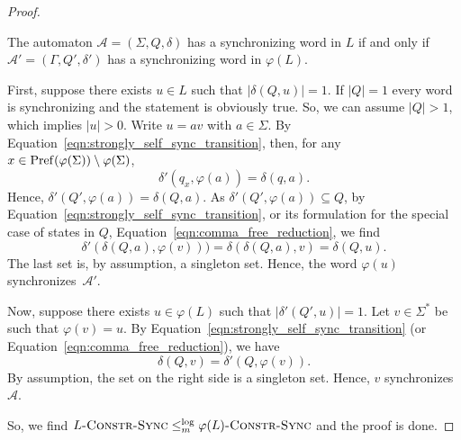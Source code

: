 \begin{proof}
  \begin{myclaiminproof}
   The automaton $\mathcal A = (\Sigma, Q, \delta)$
   has a synchronizing word in $L$
   if and only if $\mathcal A' = (\Gamma, Q', \delta')$
   has a synchronizing word in $\varphi(L)$.
  \end{myclaiminproof}
  \begin{myclaimproof}
   First, suppose there exists $u \in L$ such that $|\delta(Q, u)| = 1$.
    If $|Q| = 1$ every word is synchronizing and the statement is obviously true.
    So, we can assume $|Q| > 1$, which implies $|u| > 0$.
    Write $u = av$ with $a \in \Sigma$.
    By Equation~\eqref{eqn:strongly_self_sync_transition}, then, for any $x \in \operatorname{Pref}(\varphi(\Sigma))\setminus\varphi(\Sigma)$,
    \[
     \delta'(q_x, \varphi(a)) = \delta(q, a).
    \]
    Hence, $\delta'(Q', \varphi(a)) = \delta(Q, a)$.
    As $\delta'(Q', \varphi(a)) \subseteq Q$, by Equation~\eqref{eqn:strongly_self_sync_transition},
    or its formulation for the special case of states in $Q$, Equation~\eqref{eqn:comma_free_reduction},
    we find
    \[
     \delta'(\delta(Q, a), \varphi(v))) = \delta(\delta(Q, a), v) = \delta(Q, u).
    \]
    The last set is, by assumption, a singleton set. Hence, the word $\varphi(u)$
    synchronizes~$\mathcal A'$. %
   
    \medskip 
    
    Now, suppose there exists $u \in \varphi(L)$ such that $|\delta'(Q', u)| = 1$.
     Let $v \in \Sigma^*$ be such that $\varphi(v) = u$.
     By Equation~\eqref{eqn:strongly_self_sync_transition} (or Equation~\eqref{eqn:comma_free_reduction}),
     we have
     \[
      \delta(Q, v) = \delta'(Q, \varphi(v)).
     \]
     By assumption, the set on the right side is a singleton set. 
     Hence, $v$ synchronizes $\mathcal A$.
  \end{myclaimproof}
  So, we find $L\textsc{-Constr-Sync} \le_m^{\log} \varphi(L)\textsc{-Constr-Sync}$
  and the proof is done.
\end{proof}

